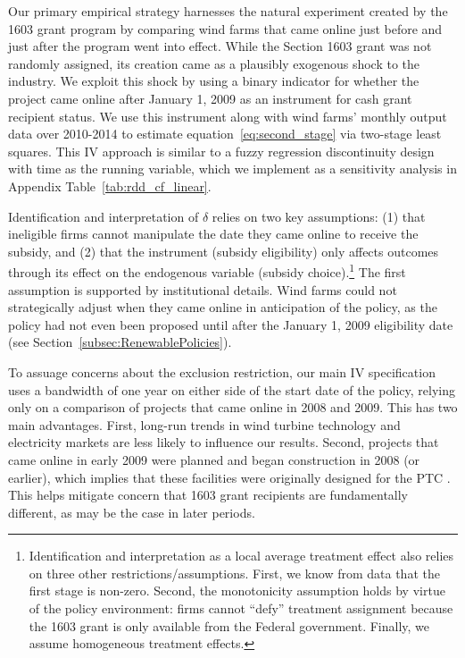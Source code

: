 \documentclass[12pt]{article}
\begin{document}
Our primary empirical strategy harnesses the natural experiment created by the 1603 grant program by comparing wind farms that came online just before and just after the program went into effect. While the Section 1603 grant was not randomly assigned, its creation came as a plausibly exogenous shock to the industry. We exploit this shock by using a binary indicator for whether the project came online after January 1, 2009 as an instrument for cash grant recipient status. We use this instrument along with wind farms' monthly output data over 2010-2014 to estimate equation~\ref{eq:second_stage} via two-stage least squares. This IV approach is similar to a fuzzy regression discontinuity design with time as the running variable, which we implement as a sensitivity analysis in Appendix Table~\ref{tab:rdd_cf_linear}.

Identification and interpretation of $\delta$ relies on two key assumptions: (1) that ineligible firms cannot manipulate the date they came online to receive the subsidy, and (2) that the instrument (subsidy eligibility) only affects outcomes through its effect on the endogenous variable (subsidy choice).\footnote{Identification and interpretation as a local average treatment effect also relies on three other restrictions/assumptions. First, we know from data that the first stage is non-zero. Second, the monotonicity assumption holds by virtue of the policy environment: firms cannot ``defy'' treatment assignment because the 1603 grant is only available from the Federal government. Finally, we assume homogeneous treatment effects.} The first assumption is supported by institutional details. Wind farms could not strategically adjust when they came online in anticipation of the policy, as the policy had not even been proposed until after the January 1, 2009 eligibility date (see Section~\ref{subsec:RenewablePolicies}). 

To assuage concerns about the exclusion restriction, our main IV specification uses a bandwidth of one year on either side of the start date of the policy, relying only on a comparison of projects that came online in 2008 and 2009. This has two main advantages. First, long-run trends in wind turbine technology and electricity markets are less likely to influence our results. Second, projects that came online in early 2009 were planned and began construction in 2008 (or earlier), which implies that these facilities were originally designed for the PTC \citep{bolinger_preliminary_2010}. This helps mitigate concern that 1603 grant recipients are fundamentally different, as may be the case in later periods. 
\end{document}
